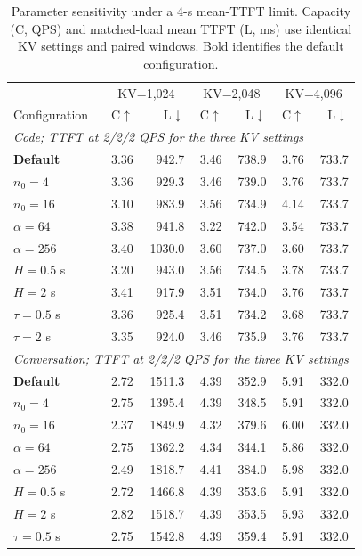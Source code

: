 \begin{table}[t]
\centering
\small
\caption{Parameter sensitivity under a 4-s mean-TTFT limit. Capacity (C, QPS) and matched-load mean TTFT (L, ms) use identical KV settings and paired windows. Bold identifies the default configuration.}
\label{tab:parameter-sensitivity-4s}
\begin{tabular}{lrrrrrr}
\toprule
& \multicolumn{2}{c}{KV=1,024} & \multicolumn{2}{c}{KV=2,048} & \multicolumn{2}{c}{KV=4,096} \\
Configuration & C$\uparrow$ & L$\downarrow$ & C$\uparrow$ & L$\downarrow$ & C$\uparrow$ & L$\downarrow$ \\
\midrule
\multicolumn{7}{l}{\textit{Code; TTFT at 2/2/2 QPS for the three KV settings}} \\
\textbf{Default} & 3.36 & 942.7 & 3.46 & 738.9 & 3.76 & 733.7 \\
$n_0=4$ & 3.36 & 929.3 & 3.46 & 739.0 & 3.76 & 733.7 \\
$n_0=16$ & 3.10 & 983.9 & 3.56 & 734.9 & 4.14 & 733.7 \\
$\alpha=64$ & 3.38 & 941.8 & 3.22 & 742.0 & 3.54 & 733.7 \\
$\alpha=256$ & 3.40 & 1030.0 & 3.60 & 737.0 & 3.60 & 733.7 \\
$H=0.5$ s & 3.20 & 943.0 & 3.56 & 734.5 & 3.78 & 733.7 \\
$H=2$ s & 3.41 & 917.9 & 3.51 & 734.0 & 3.76 & 733.7 \\
$\tau=0.5$ s & 3.36 & 925.4 & 3.51 & 734.2 & 3.68 & 733.7 \\
$\tau=2$ s & 3.35 & 924.0 & 3.46 & 735.9 & 3.76 & 733.7 \\
\midrule
\multicolumn{7}{l}{\textit{Conversation; TTFT at 2/2/2 QPS for the three KV settings}} \\
\textbf{Default} & 2.72 & 1511.3 & 4.39 & 352.9 & 5.91 & 332.0 \\
$n_0=4$ & 2.75 & 1395.4 & 4.39 & 348.5 & 5.91 & 332.0 \\
$n_0=16$ & 2.37 & 1849.9 & 4.32 & 379.6 & 6.00 & 332.0 \\
$\alpha=64$ & 2.75 & 1362.2 & 4.34 & 344.1 & 5.86 & 332.0 \\
$\alpha=256$ & 2.49 & 1818.7 & 4.41 & 384.0 & 5.98 & 332.0 \\
$H=0.5$ s & 2.72 & 1466.8 & 4.39 & 353.6 & 5.91 & 332.0 \\
$H=2$ s & 2.82 & 1518.7 & 4.39 & 353.5 & 5.93 & 332.0 \\
$\tau=0.5$ s & 2.75 & 1542.8 & 4.39 & 359.4 & 5.91 & 332.0 \\

\end{tabular}
\end{table}
